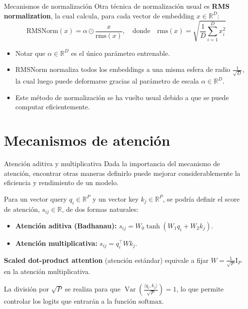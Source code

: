 \documentclass{beamer}
\newcommand{\R}{\mathbb{R}}
\begin{document}
\begin{frame}{Mecanismos de normalización}
    Otra técnica de normalización usual es \textbf{RMS normalization}, la cual calcula, para cada vector de embedding $x\in\R^D$:
    \begin{equation*}
        \text{RMSNorm}(x) = \alpha \odot \frac{x}{\text{rms}(x)},
        \quad\text{donde}\quad
        \text{rms}(x) = \sqrt{\frac{1}{D}\sum_{i=1}^{D} x_i^2}
    \end{equation*}
    \vspace{-0.5cm}
    \begin{itemize}
        \item Notar que $ \alpha \in \mathbb{R}^{D} $ es el único parámetro entrenable.
        \item RMSNorm normaliza todos los embeddings a una misma esfera de radio $\frac{1}{\sqrt{D}}$, la cual luego puede deformarse gracias al parámetro de escala $\alpha\in\R^D$.
        \item Este método de normalización se ha vuelto usual debido a que se puede computar eficientemente.
    \end{itemize}
\end{frame}

\section{Mecanismos de atención}

\begin{frame}{Atención aditiva y multiplicativa}
    Dada la importancia del mecanismo de atención, encontrar otras maneras definirlo puede mejorar considerablemente la eficiencia y rendimiento de un modelo.

    Para un vector query $q_i\in\R^P$ y un vector key $k_j\in\R^P$, se podría definir el score de atención, $s_{ij}\in\R$, de dos formas naturales:
    \begin{itemize}
        \item \textbf{Atención aditiva (Badhanau):} $s_{ij}=W_0\tanh\left(W_1q_i+W_2k_j\right)$.
        \item \textbf{Atención multiplicativa:} $s_{ij}=q_i^\top W k_j$.
    \end{itemize}
    \textbf{Scaled dot-product attention} (atención estándar) equivale a fijar $W=\frac{1}{\sqrt{P}}\text{I}_P$ en la atención multiplicativa.

    La división por $\sqrt{P}$ se realiza para que $\operatorname{Var}\left(\frac{\langle q_i, k_j\rangle}{\sqrt{P}}\right)=1$, lo que permite controlar los logits que entrarán a la función $\text{softmax}$.
\end{frame}
\end{document}
